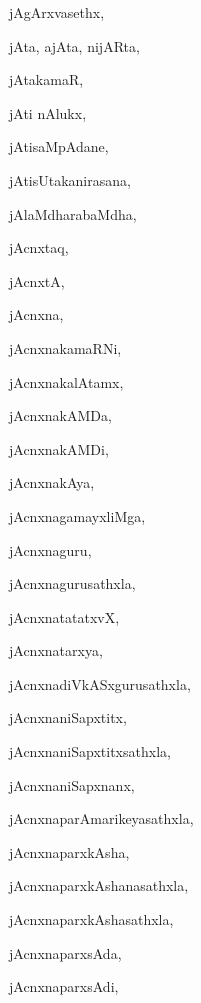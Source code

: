 \begin{multicols}{2}
{jAgArxvasethx}, \pageref{jAgArxvasethx}

{jAta, ajAta, nijARta}, \pageref{jAta, ajAta, nijARta}

{jAtakamaR}, \pageref{jAtakamaR}

{jAti nAlukx}, \pageref{jAti nAlukx}

{jAtisaMpAdane}, \pageref{jAtisaMpAdane}

{jAtisUtakanirasana}, \pageref{jAtisUtakanirasana}

{jAlaMdharabaMdha}, \pageref{jAlaMdharabaMdha}

{jAcnxtaq}, \pageref{jAcnxtaq}

{jAcnxtA}, \pageref{jAcnxtA}

{jAcnxna}, \pageref{jAcnxna}

{jAcnxnakamaRNi}, \pageref{jAcnxnakamaRNi}

{jAcnxnakalAtamx}, \pageref{jAcnxnakalAtamx}

{jAcnxnakAMDa}, \pageref{jAcnxnakAMDa}

{jAcnxnakAMDi}, \pageref{jAcnxnakAMDi}

{jAcnxnakAya}, \pageref{jAcnxnakAya}

{jAcnxnagamayxliMga}, \pageref{jAcnxnagamayxliMga}

{jAcnxnaguru}, \pageref{jAcnxnaguru}

{jAcnxnagurusathxla}, \pageref{jAcnxnagurusathxla}

{jAcnxnatatatxvX}, \pageref{jAcnxnatatatxvX}

{jAcnxnatarxya}, \pageref{jAcnxnatarxya}

{jAcnxnadiVkASxgurusathxla}, \pageref{jAcnxnadiVkASxgurusathxla}

{jAcnxnaniSapxtitx}, \pageref{jAcnxnaniSapxtitx}

{jAcnxnaniSapxtitxsathxla}, \pageref{jAcnxnaniSapxtitxsathxla}

{jAcnxnaniSapxnanx}, \pageref{jAcnxnaniSapxnanx}

{jAcnxnaparAmarikeyasathxla}, \pageref{jAcnxnaparAmarikeyasathxla}

{jAcnxnaparxkAsha}, \pageref{jAcnxnaparxkAsha}

{jAcnxnaparxkAshanasathxla}, \pageref{jAcnxnaparxkAshanasathxla}

{jAcnxnaparxkAshasathxla}, \pageref{jAcnxnaparxkAshasathxla}

{jAcnxnaparxsAda}, \pageref{jAcnxnaparxsAda}

{jAcnxnaparxsAdi}, \pageref{jAcnxnaparxsAdi}


\end{multicols}
